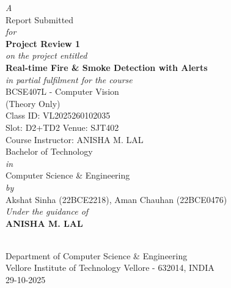 \documentclass[12pt,a4paper]{article}
\newcommand{\optionalinclude}[2]{%
  \IfFileExists{#1}{\texttt{[image: \#1]}}{\fbox{\rule{0pt}{0.35#2}\rule{#2}{0pt}}}}
\begin{document}
\begin{titlepage}
  \centering
  \begingroup{}
  {\itshape A\\[0.5em]}
  {\large Report Submitted\\[0.5em]}
  {\itshape for\\[0.5em]}
  {\LARGE\bfseries Project Review 1\\[0.5em]}
  {\itshape on the project entitled\\[0.5em]}
  {\LARGE\bfseries Real-time Fire \& Smoke Detection with Alerts\\[0.8em]}
  {\itshape in partial fulfilment for the course\\[0.4em]}
  {\Large BCSE407L - Computer Vision\\[0.4em]}
  {\small (Theory Only)\\[0.4em]}
  {\small Class ID: VL2025260102035\\[0.2em]}
  {\small Slot: D2+TD2 \textbullet{} Venue: SJT402\\[0.2em]}
  {\small Course Instructor: ANISHA M. LAL\\[0.6em]}
  {\large Bachelor of Technology\\[0.2em]}
  {\itshape in\\[0.2em]}
  {\Large Computer Science \& Engineering\\[0.6em]}
  {\itshape by\\[0.3em]}
  {\large Akshat Sinha (22BCE2218), Aman Chauhan (22BCE0476)\\[0.6em]}
  {\itshape Under the guidance of\\[0.2em]}
  {\Large\bfseries ANISHA M. LAL\\[0.6em]}

  \optionalinclude{VIT LOGO.png}{0.25\textwidth}\\[0.6em]

  {Department of Computer Science \& Engineering\\[0.3em]}
  {Vellore Institute of Technology Vellore - 632014, INDIA\\[0.6em]}
  {29-10-2025}
  \endgroup
\end{titlepage}

\end{document}
